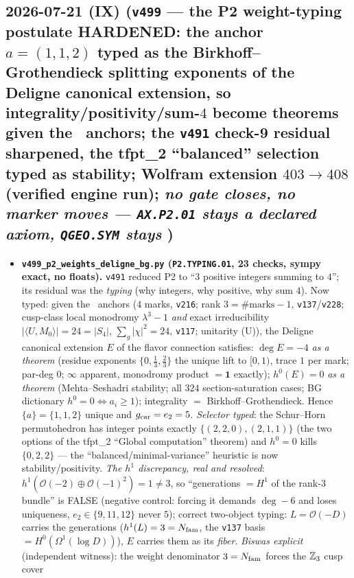 \subsection*{2026-07-21 (IX) (\texttt{v499} --- the P2 weight-typing postulate HARDENED: the anchor $a=(1,1,2)$ typed as the Birkhoff--Grothendieck splitting exponents of the Deligne canonical extension, so integrality/positivity/sum-$4$ become theorems given the \mE\ anchors; the \texttt{v491} check-9 residual sharpened, the tfpt\_2 ``balanced'' selection typed as stability; Wolfram extension $403\to408$ (verified engine run); \emph{no gate closes, no marker moves --- \texttt{AX.P2.01} stays a declared axiom, \texttt{QGEO.SYM} stays \mO})}
\begin{itemize}[leftmargin=1.5em]
\item \textbf{\texttt{v499\_p2\_weights\_deligne\_bg.py} (\texttt{P2.TYPING.01}, 23 checks, sympy exact,
no floats).} \texttt{v491} reduced P2 to ``$3$ positive integers summing to $4$''; its residual was the
\emph{typing} (why integers, why positive, why sum $4$). Now typed: given the \mE\ anchors ($4$ marks,
\texttt{v216}; rank $3=\#\text{marks}-1$, \texttt{v137}/\texttt{v228}; cusp-class local monodromy
$\lambda^3-1$ \emph{and} exact irreducibility $|\langle U,M_0\rangle|=24=|S_4|$, $\sum_g|\chi|^2=24$,
\texttt{v117}; unitarity (U)), the Deligne canonical extension $E$ of the flavor connection satisfies:
$\deg E=-4$ \emph{as a theorem} (residue exponents $\{0,\tfrac13,\tfrac23\}$ the unique lift to $[0,1)$,
trace $1$ per mark; par-deg $0$; $\infty$ apparent, monodromy product $=\mathbf1$ exactly);
$h^0(E)=0$ \emph{as a theorem} (Mehta--Seshadri stability; all $324$ section-saturation cases; BG
dictionary $h^0{=}0\Leftrightarrow a_i\ge1$); integrality $=$ Birkhoff--Grothendieck. Hence
$\{a\}=\{1,1,2\}$ unique and $g_{\mathrm{car}}=e_2=5$. \emph{Selector typed}: the Schur--Horn permutohedron has
integer points exactly $\{(2,2,0),(2,1,1)\}$ (the two options of the tfpt\_2 ``Global computation''
theorem) and $h^0{=}0$ kills $\{0,2,2\}$ --- the ``balanced/minimal-variance'' heuristic is now
stability/positivity. \emph{The $h^1$ discrepancy, real and resolved}: $h^1(\mathcal
O(-2){\oplus}\mathcal O(-1)^2)=1\neq3$, so ``generations $=H^1$ of the rank-$3$ bundle'' is FALSE
(negative control: forcing it demands $\deg-6$ and loses uniqueness, $e_2\in\{9,11,12\}$ never $5$);
correct two-object typing: $L=\mathcal O(-D)$ carries the generations ($h^1(L)=3=N_{\mathrm{fam}}$, the
\texttt{v137} basis $=H^0(\Omega^1(\log D))$), $E$ carries them as its \emph{fiber}. \emph{Biswas
explicit} (independent witness): the weight denominator $3=N_{\mathrm{fam}}$ forces the $\mathbb{Z}_3$ cusp cover

\end{itemize}

